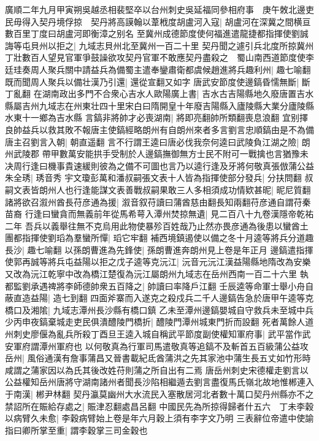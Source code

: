廣順二年九月甲寅朔吳越丞相裴堅卒以台州刺史吳延福同參相府事　庚午敇北邊吏民毋得入契丹境俘掠　契丹將高謨翰以葦栰度胡盧河入寇|{
	胡盧河在深冀之間横亘數百里丁度曰胡盧河即衡漳之别名}
至冀州成德節度使何福進遣龍捷都指揮使劉誠誨等屯貝州以拒之|{
	九域志貝州北至冀州一百二十里}
契丹聞之遽引兵北度所掠冀州丁壯數百人望見官軍爭鼓譟欲攻契丹官軍不敢應契丹盡殺之　蜀山南西道節度使李廷珪奏周人聚兵關中請益兵為備蜀主遣奉鑾肅衛都虞候趙進將兵趣利州|{
	趣七喻翻}
既而聞周人聚兵以備壮漢乃引還|{
	還從宣翻又如字}
唐武安節度使邊鎬昏懦無斷|{
	斷丁亂翻}
在湖南政出多門不合衆心吉水人歐陽廣上書|{
	吉水古吉陽縣地久廢唐置吉水縣屬吉州九域志在州東壮四十里宋白曰隋開皇十年廢吉陽縣入廬陵縣大業分廬陵縣水東十一鄉為吉水縣}
言鎬非將帥才必喪湖南|{
	將即亮翻帥所類翻喪息浪翻}
宜别擇良帥益兵以救其敗不報唐主使鎬經略朗州有自朗州來者多言劉言忠順鎬由是不為備唐主召劉言入朝|{
	朝直遥翻}
言不行謂王逵曰唐必伐我奈何逵曰武陵負江湖之險|{
	朗州武陵郡}
帶甲數萬安能拱手受制於人邊鎬撫御無方士民不附可一戰擒也言猶豫未决周行逢曰機事貴速緩則彼為之備不可圖也言乃以逵行逢及牙將何敬真張倣蒲公益朱全琇|{
	琇音秀}
宇文瓊彭萬和潘叔嗣張文表十人皆為指揮使部分發兵|{
	分扶問翻}
叔嗣文表皆朗州人也行逢能謀文表善戰叔嗣果敢三人多相須成功情欵甚昵|{
	昵尼質翻}
諸將欲召溆州酋長苻彦通為援|{
	溆音叙苻讀曰蒲酋慈由翻長知兩翻苻彦通自謂苻秦苗裔}
行逢曰蠻貪而無義前年從馬希萼入潭州焚掠無遺|{
	見二百八十九卷漢隱帝乾祐二年}
吾兵以義舉往無不克烏用此物使暴殄百姓哉乃止然亦畏彦通為後患以蠻酋土團都指揮使劉瑫為羣蠻所憚|{
	瑫它牢翻}
補西境鎮遏使以備之冬十月逵等將兵分道趣長沙|{
	趣七喻翻}
以孫朗曹進為先鋒使|{
	孫朗曹進奔朗州見上卷是年正月}
邊鎬遣指揮使郭再誠等將兵屯益陽以拒之戊子逵等克沅江|{
	沅音元沅江漢益陽縣地隋改為安樂又改為沅江乾寧中改為橋江楚復為沅江屬朗州九域志在岳州西南一百二十六里}
執都監劉承遇禆將李師德帥衆五百降之|{
	帥讀曰率降戶江翻}
壬辰逵等命軍士舉小舟自蔽直造益陽|{
	造七到翻}
四面斧寨而入遂克之殺戍兵二千人邊鎬告急於唐甲午逵等克橋口及湘隂|{
	九域志潭州長沙縣有橋口鎮}
乙未至潭州邊鎬嬰城自守救兵未至城中兵少丙申夜鎬棄城走吏民俱潰醴陵門橋折|{
	醴陵門潭州城東門折而設翻}
死者萬餘人道州刺史廖偃為亂兵所殺丁酉旦王逵入城自稱武平節度副使權知軍府事|{
	武平當作武安軍府謂潭州軍府也}
以何敬真為行軍司馬遣敬真等追鎬不及斬首五百級蒲公益攻岳州|{
	風俗通漢有詹事蒲昌又晉書載紀氐酋蒲洪之先其家池中蒲生長五丈如竹形時咸謂之蒲家因以為氏其後改姓苻則蒲之所自出有二焉}
唐岳州刺史宋德權走劉言以公益權知岳州唐將守湖南諸州者聞長沙陷相繼遁去劉言盡復馬氏嶺北故地惟郴連入于南漢|{
	郴尹林翻}
契丹瀛莫幽州大水流民入塞散居河北者數十萬口契丹州縣亦不之禁詔所在賑給存處之|{
	賑津忍翻處昌呂翻}
中國民先為所掠得歸者什五六　丁未李穀以病臂久未愈|{
	李穀病臂始上卷是年六月穀上須有李字文乃明}
三表辭位帝遣中使諭指曰卿所掌至重|{
	謂李穀掌三司金穀也}
